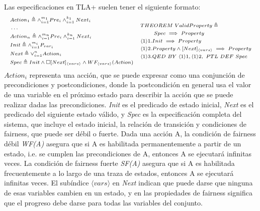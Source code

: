 \documentclass[runningheads]{llncs}
\begin{document}
Las especificaciones en TLA+ suelen tener el siguiente formato:
%
\[
\begin{array}{cc}
\begin{scriptsize}
\begin{aligned}
    & Action_1 \triangleq \land_{i=1}^{m_1} Pre_i \land_{i=1}^{k_1} Next_i \\
    & \dots \\
    & Action_n \triangleq \land_{i=1}^{m_n} Pre_i \land_{i=1}^{k_n} Next_i \\
    & Init \triangleq \land_{i=1}^{m_i} P_{var_i} \\
    & Next \triangleq \lor_{i=1}^{n} Action_i \\
    & Spec \triangleq Init \land \square [Next]_{\langle vars \rangle} \land WF_{\langle vars \rangle}(Action)
\end{aligned}
\end{scriptsize}
&
\begin{scriptsize}
\begin{aligned}
    & THEOREM\ ValidProperty \triangleq \\
    & \phantom{THE} Spec \implies Property \\
    & \langle 1 \rangle1. Init \implies Property \\
    & \langle 1 \rangle2. Property \land [Next]_{\langle vars \rangle} \implies Property \\
    & \langle 1 \rangle3. QED\ BY\ \langle 1 \rangle1, \langle 1 \rangle2,\ PTL\ DEF\ Spec
\end{aligned}
\end{scriptsize}
\end{array}
\]
%
$Action_{i}$ representa una acción, que se puede expresar como una conjunción de precondiciones y postcondiciones, donde la postcondición en general usa el valor de una variable en el próximo estado para describir la acción que se puede realizar dadas las precondiciones. \textit{Init} es el predicado de estado inicial, \textit{Next} es el predicado del siguiente estado válido, y \textit{Spec} es la especificación completa del sistema, que incluye el estado inicial, la relación de transición y condiciones de fairness, que puede ser débil o fuerte. Dada una acción A, la condición de fairness débil \textit{WF(A)} asegura que si A es habilitada permanentemente a partir de un estado, i.e. se cumplen las precondiciones de A, entonces A se ejecutará infinitas veces. La condición de fairness fuerte \textit{SF(A)} asegura que si A es habilitada frecuentemente a lo largo de una traza de estados, entonces A se ejecutará infinitas veces. El subíndice $\langle vars \rangle$ en \textit{Next} indican que puede darse que ninguna de esas variables cambien en un estado, y en las propiedades de fairness significa que el progreso debe darse para todas las variables del conjunto. 
\end{document}
